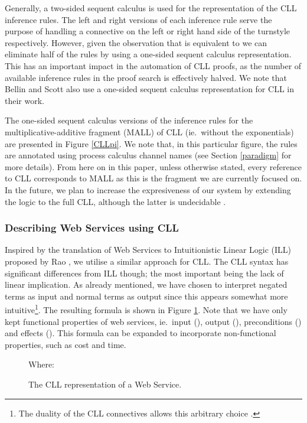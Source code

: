 \documentclass[copyright,creativecommons]{eptcs}
\begin{document}
Generally, a two-sided sequent calculus is used for the representation of the CLL inference rules. The left and right versions of each inference rule serve the purpose of handling a connective on the left or right hand side of the turnstyle respectively. However, given the observation that  is equivalent to  we can eliminate half of the rules by using a one-sided sequent calculus representation. This has an important impact in the automation of CLL proofs, as the number of available inference rules in the proof search is effectively halved. We note that Bellin and Scott also use a one-sided sequent calculus representation for CLL in their work.

The one-sided sequent calculus versions of the inference rules for the multiplicative-additive fragment (MALL) of CLL (ie.\ without the exponentials) are presented in Figure \ref{CLLpi}. We note that, in this particular figure, the rules are annotated using process calculus channel names (see Section \ref{paradigm} for more details). From here on in this paper, unless otherwise stated, every reference to CLL corresponds to MALL as this is the fragment we are currently focused on. In the future, we plan to increase the expresiveness of our system by extending the logic to the full CLL, although the latter is undecidable \cite{john1992decision}. 

\subsubsection{Describing Web Services using CLL}
\label{WSCLL}

Inspired by the translation of Web Services to Intuitionistic Linear Logic (ILL) proposed by Rao \cite{rao-semantic}, we utilise a similar approach for CLL. The CLL syntax has significant differences from ILL though; the most important being the lack of linear implication. As already mentioned, we have chosen to interpret negated terms as input and normal terms as output since this appears somewhat more intuitive\footnote{The duality of the CLL connectives allows this arbitrary choice \cite{bellin1994}.}. The resulting formula is shown in Figure \ref{fig:CLLSWS}. Note that we have only kept functional properties of web services, ie.\ input (), output (), preconditions () and effects (). This formula can be expanded to incorporate non-functional properties, such as cost and time.

\begin{figure}[htbp]
	\centering
		
		Where: 
	\caption{The CLL representation of a Web Service.}
	\label{fig:CLLSWS}
\end{figure} 
\end{document}
